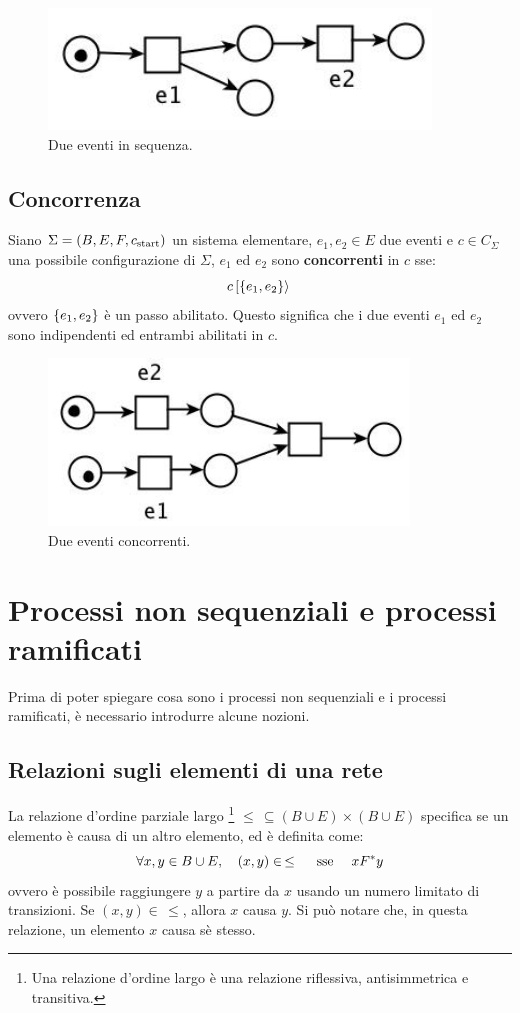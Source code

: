 \begin{figure}
    \centering
    \includegraphics[width=0.5\linewidth]{img/sequenza.png}
    \caption{Due eventi in sequenza.}
    \label{fig:eventi_sequenza}
\end{figure}

\subsection*{Concorrenza}
Siano $\Sigma = (B, E, F, c_{\textnormal{start}})$ un sistema elementare,
$e_1, e_2 \in E$ due eventi e $c \in C_{\Sigma}$ una possibile configurazione
di $\Sigma$, $e_1$ ed $e_2$ sono \textbf{concorrenti} in $c$ sse:
\[
    c\,[\left\{e_1, e_2\right\}\rangle\,
\]
ovvero $\left\{e_1, e_2\right\}$ è un passo abilitato. Questo significa che i due
eventi $e_1$ ed $e_2$ sono indipendenti ed entrambi abilitati in $c$.

\begin{figure}
    \centering
    \includegraphics[width=0.5\linewidth]{img/eventi_concorrenti.png}
    \caption{Due eventi concorrenti.}
    \label{fig:eventi_concorrenti}
\end{figure}

\section{Processi non sequenziali e processi ramificati}
Prima di poter spiegare cosa sono i processi non sequenziali e i processi
ramificati, è necessario introdurre alcune nozioni.

\subsection*{Relazioni sugli elementi di una rete}
\begin{defn}
    La relazione d'ordine parziale largo \footnote{Una relazione d'ordine largo
    è una relazione riflessiva, antisimmetrica e transitiva.}
    $\le \, \subseteq (B \cup E) \times (B \cup E)$ specifica se un elemento
    è causa di un altro elemento, ed è definita come:
    \[
        \forall x, y \in B \cup E, \quad (x, y) \in \, \le \quad
        \textnormal{ sse } \quad x F^*y
    \]
    ovvero è possibile raggiungere $y$ a partire da $x$ usando un numero
    limitato di transizioni. Se $(x,y) \in \, \le$, allora $x$ causa $y$.
    Si può notare che, in questa relazione, un elemento $x$ causa sè stesso.
\end{defn}

